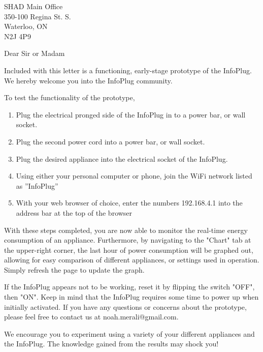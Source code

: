 \documentclass[]{letter}
\begin{document}
	\signature{InfoPlug Ltd.}
	\address{Memorial University of Newfoundland \\ St. Johns,  NL\\A1B 3X9}
	\begin{letter}{SHAD Main Office \\ 350-100 Regina St. S. \\ Waterloo, ON \\ N2J 4P9}
		\opening{Dear Sir or Madam}
		
		Included with this letter is a functioning, early-stage prototype of the InfoPlug. We hereby welcome you into the InfoPlug community.
		
		To test the functionality of the prototype,

		 \begin{enumerate}

		 	\item Plug the electrical pronged side of the InfoPlug in to a power bar, or wall socket.
		 	\item Plug the second power cord into a power bar, or wall socket.
		 	\item Plug the desired appliance into the electrical socket of the InfoPlug.
		 	\item Using either your personal computer or phone, join the WiFi network listed as ”InfoPlug”
		 	\item With your web browser of choice, enter the numbers 192.168.4.1 into the address bar at the top of the browser
		 \end{enumerate}
		
		With these steps completed, you are now able to monitor the real-time energy consumption of an appliance. Furthermore, by navigating to the "Chart" tab at the upper-right corner, the last hour of power consumption will be graphed out, allowing for easy comparison of different appliances, or settings used in operation. Simply refresh the page to update the graph. 
		
		If the InfoPlug appears not to be working, reset it by flipping the switch "OFF", then "ON". Keep in mind that the InfoPlug requires some time to power up when initially activated. If you have any questions or concerns about the prototype, please feel free to contact us at noah.merali@gmail.com. 
		
		We encourage you to experiment using a variety of your different appliances and the InfoPlug. The knowledge gained from the results may shock you!
		

\end{letter}
\end{document}
